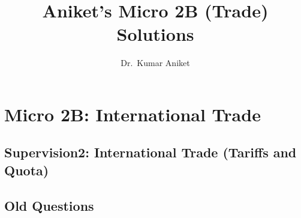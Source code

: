 \documentclass[11pt,reqno]{amsbook}
\title{Aniket's Micro 2B (Trade) Solutions}
\author{Dr.~Kumar Aniket}
\begin{document}



 \frontmatter
 \maketitle
 \tableofcontents
 \mainmatter


\part{Micro 2B: International Trade}
%


% 


\chapter*{Supervision2: International Trade (Tariffs and Quota)}



\chapter*{Old Questions}









\newpage

\backmatter
%
%
\printindex




 
 
\end{document}
